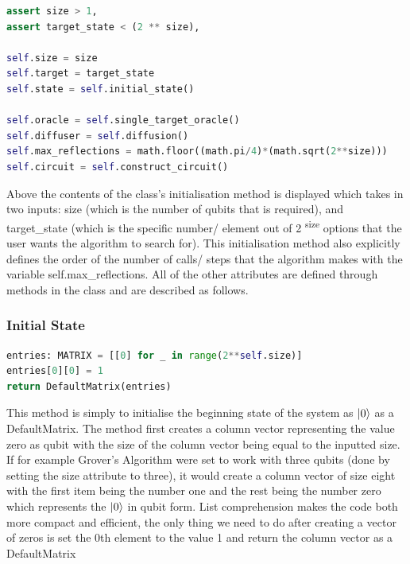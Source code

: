 \documentclass{article}
\begin{document}
\begin{file}

\begin{lstlisting}[linewidth=15cm,language=Python]
assert size > 1, 
assert target_state < (2 ** size),

self.size = size
self.target = target_state
self.state = self.initial_state()

self.oracle = self.single_target_oracle()
self.diffuser = self.diffusion()
self.max_reflections = math.floor((math.pi/4)*(math.sqrt(2**size)))
self.circuit = self.construct_circuit()
\end{lstlisting}

\end{file}

Above the contents of the class's initialisation method is displayed which takes in two inputs: size (which is the number of qubits that is required), and target\_state (which is the specific number/ element out of 2 \textsuperscript{size} options that the user wants the algorithm to search for). This initialisation method also explicitly defines the order of the number of calls/ steps that the algorithm makes with the variable self.max\_reflections. All of the other attributes are defined through methods in the class and are described as follows.

\subsubsection{Initial State} \label{Initial State}

\begin{file}
\begin{lstlisting}[language=Python]
entries: MATRIX = [[0] for _ in range(2**self.size)]
entries[0][0] = 1
return DefaultMatrix(entries)
\end{lstlisting}
\end{file}

This method is simply to initialise the beginning state of the system as $\ket{0}$ as a DefaultMatrix. The method first creates a column vector representing the value zero as qubit with the size of the column vector being equal to the inputted size. If for example Grover's Algorithm were set to work with three qubits (done by setting the size attribute to three), it would create a column vector of size eight with the first item being the number one and the rest being the number zero which represents the $\ket{0}$ in qubit form. List comprehension makes the code both more compact and efficient, the only thing we need to do after creating a vector of zeros is set the 0th element to the value 1 and return the column vector as a DefaultMatrix
\end{document}
